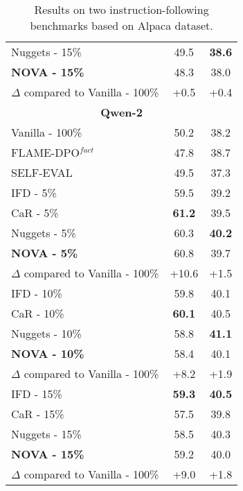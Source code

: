 \begin{table}[t]
{\begin{tabular}{lcc}
Nuggets - 15\% & 49.5 & \textbf{38.6} \\
\rowcolor{blue!5} \textbf{NOVA - 15\%} & 48.3 & 38.0 \\
\hdashline[2pt/3pt]
\rowcolor{blue!5} $\Delta$ compared to Vanilla - 100\% & \textcolor[rgb]{0.7,0,0}{+0.5} & \textcolor[rgb]{0.7,0,0}{+0.4} \\
\midrule
\multicolumn{3}{c}{\cellcolor{myyellow} \textbf{Qwen-2}}\\
Vanilla - 100\% & 50.2 & 38.2 \\
FLAME-DPO$^{fact}$ & 47.8 & 38.7 \\
SELF-EVAL & 49.5 & 37.3 \\
\midrule
IFD - 5\% & 59.5 & 39.2 \\
CaR - 5\% & \textbf{61.2} & 39.5 \\ 
Nuggets - 5\% & 60.3 & \textbf{40.2} \\
\rowcolor{blue!5} \textbf{NOVA - 5\%} & 60.8 & 39.7  \\
\hdashline[2pt/3pt]
\rowcolor{blue!5} $\Delta$ compared to Vanilla - 100\% & \textcolor[rgb]{0.7,0,0}{+10.6} & \textcolor[rgb]{0.7,0,0}{+1.5} \\
\midrule
IFD - 10\% & 59.8 & 40.1 \\
CaR - 10\% & \textbf{60.1} & 40.5 \\
Nuggets - 10\% & 58.8 & \textbf{41.1} \\
\rowcolor{blue!5} \textbf{NOVA - 10\%} & 58.4 & 40.1 \\
\hdashline[2pt/3pt]
\rowcolor{blue!5} $\Delta$ compared to Vanilla - 100\% & \textcolor[rgb]{0.7,0,0}{+8.2} & \textcolor[rgb]{0.7,0,0}{+1.9} \\
\midrule
IFD - 15\% & \textbf{59.3} & \textbf{40.5} \\
CaR - 15\% & 57.5 & 39.8 \\
Nuggets - 15\% & 58.5 & 40.3 \\
\rowcolor{blue!5} \textbf{NOVA - 15\%} & 59.2 & 40.0 \\
\hdashline[2pt/3pt]
\rowcolor{blue!5} $\Delta$ compared to Vanilla - 100\% & \textcolor[rgb]{0.7,0,0}{+9.0} & \textcolor[rgb]{0.7,0,0}{+1.8} \\
\bottomrule
\end{tabular}}
\caption{Results on two instruction-following benchmarks based on Alpaca dataset.}
\label{tb:1-if} 
\end{table}









